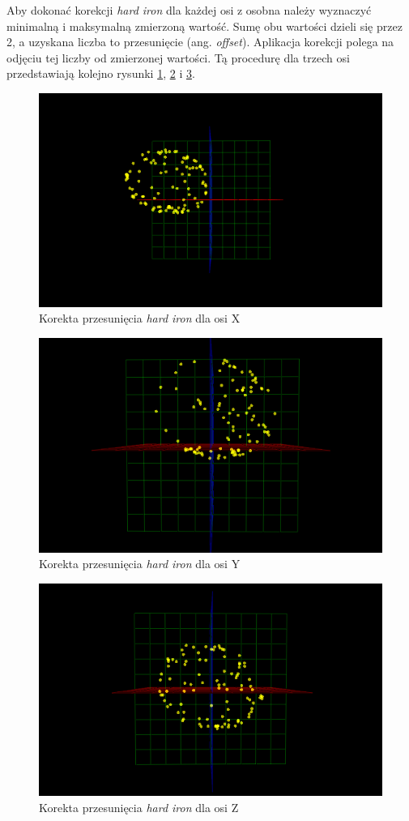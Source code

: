 Aby dokonać korekcji \emph{hard iron} \cite{hard-iron}\cite{hard-soft-iron} dla każdej osi z osobna należy wyznaczyć minimalną i maksymalną zmierzoną wartość. Sumę obu wartości dzieli się przez 2, a uzyskana liczba to przesunięcie (ang. \emph{offset}). Aplikacja korekcji polega na odjęciu tej liczby od zmierzonej wartości.
Tą procedurę dla trzech osi przedstawiają kolejno rysunki \ref{fig:3d-mag-hard-corr-x}, \ref{fig:3d-mag-hard-corr-y} i \ref{fig:3d-mag-hard-corr-z}.

\begin{figure}[H]
	\centering
		\includegraphics[width=0.6\linewidth]{rys/ScanBot-04-magnetometer-3d-calibration.PNG}
	\caption{Korekta przesunięcia \emph{hard iron} dla osi X}
	\label{fig:3d-mag-hard-corr-x}
\end{figure}

\begin{figure}[H]
	\centering
		\includegraphics[width=0.6\linewidth]{rys/ScanBot-05-magnetometer-3d-calibration.PNG}
	\caption{Korekta przesunięcia \emph{hard iron} dla osi Y}
	\label{fig:3d-mag-hard-corr-y}
\end{figure}

\begin{figure}[H]
	\centering
		\includegraphics[width=0.6\linewidth]{rys/ScanBot-06-magnetometer-3d-calibration.PNG}
	\caption{Korekta przesunięcia \emph{hard iron} dla osi Z}
	\label{fig:3d-mag-hard-corr-z}
\end{figure}

